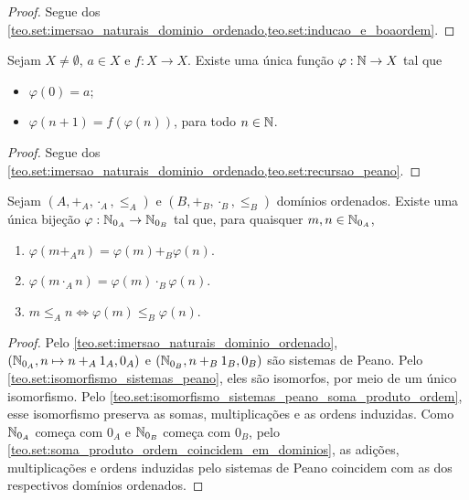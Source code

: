 \begin{proof}
    Segue dos \cref{teo.set:imersao_naturais_dominio_ordenado,teo.set:inducao_e_boaordem}. \blackproof
\end{proof}

\begin{corollary}[da Recursão] \label{teo.reais:recursão}
    Sejam $X \neq \emptyset$, $a \in X$ e $f:X \to X$. Existe uma única função $\varphi : \mathbb{N} \to X$ tal que
        \begin{itemize}
            \item $\varphi(0) = a$;
            \item $\varphi(n + 1) = f(\varphi(n))$, para todo $n \in \mathbb{N}$.
        \end{itemize}
\end{corollary}

\begin{proof}
    Segue dos \cref{teo.set:imersao_naturais_dominio_ordenado,teo.set:recursao_peano}. \blackproof
\end{proof}

\begin{corollary}
    Sejam $(A, +_{A}, \cdot_{A}, \leq_{A})$ e $(B, +_{B}, \cdot_{B}, \leq_{B})$ domínios ordenados. Existe uma única bijeção $\varphi : \mathbb{N}_{0_{A}} \to \mathbb{N}_{0_{B}}$ tal que, para quaisquer $m,n \in \mathbb{N}_{0_{A}}$,
        \begin{enumerate}[label=\roman*.]
            \item $\varphi (m +_{A} n) = \varphi(m) +_{B} \varphi(n)$.
            \item $\varphi (m \cdot_{A} n) = \varphi(m) \cdot_{B} \varphi(n)$.
            \item $m \leq_{A} n \Leftrightarrow \varphi(m) \leq_{B} \varphi(n)$.
        \end{enumerate}
\end{corollary}

\begin{proof}
    Pelo \cref{teo.set:imersao_naturais_dominio_ordenado}, $(\mathbb{N}_{0_{A}}, n \mapsto n +_{A} 1_{A}, 0_{A})$ e $(\mathbb{N}_{0_{B}}, n +_{B} 1_{B}, 0_{B})$ são sistemas de Peano. Pelo \cref{teo.set:isomorfismo_sistemas_peano}, eles são isomorfos, por meio de um único isomorfismo. Pelo \cref{teo.set:isomorfismo_sistemas_peano_soma_produto_ordem}, esse isomorfismo preserva as somas, multiplicações e as ordens induzidas. Como $\mathbb{N}_{0_{A}}$ começa com $0_{A}$ e $\mathbb{N}_{0_{B}}$ começa com $0_{B}$, pelo \cref{teo.set:soma_produto_ordem_coincidem_em_dominios}, as adições, multiplicações e ordens induzidas pelo sistemas de Peano coincidem com as dos respectivos domínios ordenados. \blackproof
\end{proof}

